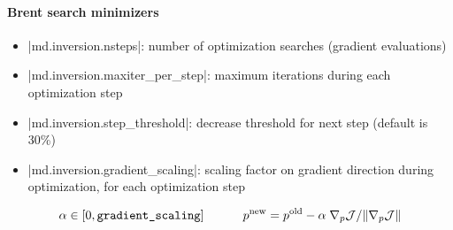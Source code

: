 \paragraph{Brent search minimizers}%
\begin{itemize}
	\item \lstinlinebg|md.inversion.nsteps|: number of optimization searches (gradient evaluations)
	\item \lstinlinebg|md.inversion.maxiter_per_step|: maximum iterations during each optimization step
	\item \lstinlinebg|md.inversion.step_threshold|: decrease threshold for next step (default is 30\%)
	\item \lstinlinebg|md.inversion.gradient_scaling|: scaling factor on gradient direction during optimization, for each optimization step
\end{itemize}
\begin{equation}
	\alpha\in\left[0,\text{\ttfamily gradient\_scaling} \right]\hspace{3em}
	p^{\text{new}}=p^{\text{old}}-\alpha\;\nabla_p {\mathcal J}/\|\nabla_p {\mathcal J}\|
\end{equation}

